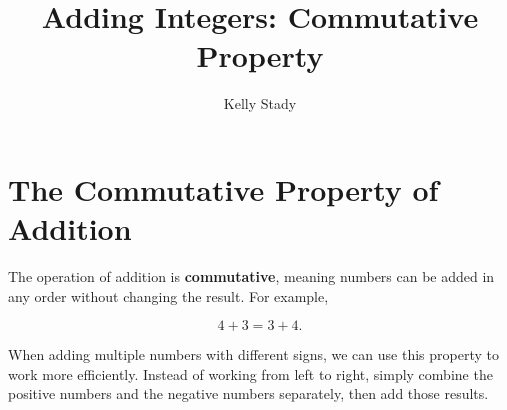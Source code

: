 \documentclass{ximera}[font=12pt]
\title{Adding Integers: Commutative Property}   %
\author{Kelly Stady}
\begin{document}
\begin{abstract}

\end{abstract}

\maketitle
\label{xim:AddIntCommPropActivity}


\section*{The Commutative Property of Addition}

The operation of addition is \textbf{commutative}, meaning numbers can be added in any order without changing the result.  For example,

\[ 4 + 3 = 3 + 4. \]

When adding multiple numbers with different signs, we can use this property to work more efficiently. Instead of working from left to right, simply combine the positive numbers and the negative numbers separately, then add those results.

\bigskip
\end{document}

